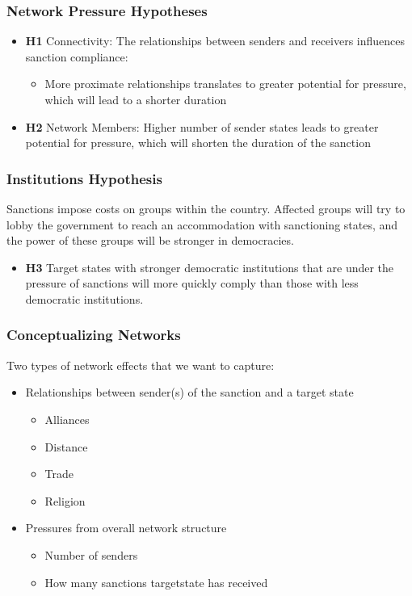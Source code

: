 \documentclass{beamer}
\begin{document}
\begin{frame}
\frametitle{Network Pressure Hypotheses}
\begin{itemize}
		\item \textbf{H1} Connectivity: The relationships between senders and receivers influences sanction compliance: 
		\begin{itemize}
			\item More proximate relationships translates to greater potential for pressure, which will lead to a shorter duration
		\end{itemize}
		\item \textbf{H2} Network Members: Higher number of sender states leads to greater potential for pressure, which will shorten the duration of the sanction 
\end{itemize} 
\end{frame}

\begin{frame}
\frametitle{Institutions Hypothesis}
	Sanctions impose costs on groups within the country. Affected groups will try to lobby the government to reach an accommodation with sanctioning states, and the power of these groups will be stronger in democracies.
	\begin{itemize}
	\item \textbf{H3} Target states with stronger democratic institutions that are under the pressure of sanctions will more quickly comply than those with less democratic institutions. 
\end{itemize}
\end{frame}

\begin{frame}
\frametitle{Conceptualizing Networks}

Two types of network effects that we want to capture:

\begin{itemize}
	\item Relationships between sender(s) of the sanction and a target state
	\begin{itemize}
		\item Alliances
		\item Distance
		\item Trade
		\item Religion
	\end{itemize}
	\item Pressures from overall network structure
	\begin{itemize}
		\item Number of senders
		\item How many sanctions targetstate has received
	\end{itemize}
\end{itemize}

\end{frame}
\end{document}
